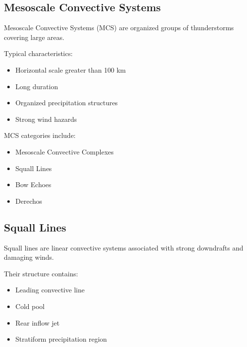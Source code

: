 
\subsection{Mesoscale Convective Systems}

Mesoscale Convective Systems (MCS) are organized groups of thunderstorms
covering large areas.

Typical characteristics:

\begin{itemize}

\item Horizontal scale greater than 100 km

\item Long duration

\item Organized precipitation structures

\item Strong wind hazards

\end{itemize}


MCS categories include:

\begin{itemize}

\item Mesoscale Convective Complexes

\item Squall Lines

\item Bow Echoes

\item Derechos

\end{itemize}


\subsection{Squall Lines}

Squall lines are linear convective systems associated with strong
downdrafts and damaging winds.

Their structure contains:

\begin{itemize}

\item Leading convective line

\item Cold pool

\item Rear inflow jet

\item Stratiform precipitation region

\end{itemize}


